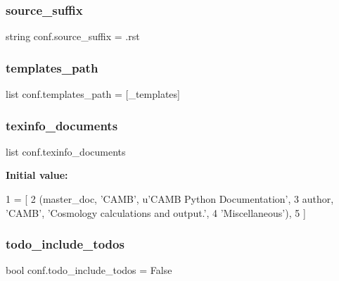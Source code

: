 \mbox{\label{namespaceconf_a1e0ba7f4cb1d50fa831f1236a77d60f6}} 
\subsubsection{\texorpdfstring{source\+\_\+suffix}{source\_suffix}}
{\footnotesize\ttfamily string conf.\+source\+\_\+suffix = \textquotesingle{}.rst\textquotesingle{}}

\mbox{\label{namespaceconf_ae850ae634911b713e036b43894fdd525}} 
\subsubsection{\texorpdfstring{templates\+\_\+path}{templates\_path}}
{\footnotesize\ttfamily list conf.\+templates\+\_\+path = \mbox{[}\textquotesingle{}\+\_\+templates\textquotesingle{}\mbox{]}}

\mbox{\label{namespaceconf_a22cc2d5df880ae78ca10c4675b494602}} 
\subsubsection{\texorpdfstring{texinfo\+\_\+documents}{texinfo\_documents}}
{\footnotesize\ttfamily list conf.\+texinfo\+\_\+documents}

{\bfseries Initial value\+:}
\begin{DoxyCode}
1 =  [
2   (master\_doc, \textcolor{stringliteral}{'CAMB'}, \textcolor{stringliteral}{u'CAMB Python Documentation'},
3    author, \textcolor{stringliteral}{'CAMB'}, \textcolor{stringliteral}{'Cosmology calculations and output.'},
4    \textcolor{stringliteral}{'Miscellaneous'}),
5 ]
\end{DoxyCode}
\mbox{\label{namespaceconf_a9c4d0250afe7e547830927b55eadeec5}} 
\subsubsection{\texorpdfstring{todo\+\_\+include\+\_\+todos}{todo\_include\_todos}}
{\footnotesize\ttfamily bool conf.\+todo\+\_\+include\+\_\+todos = False}

